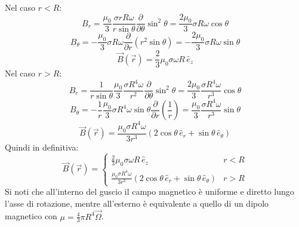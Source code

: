 \documentclass[]{article}
\begin{document}
Nel caso $ r < R $:
\begin{equation}
	B_r = \displaystyle\frac{\mu_0}{3} \displaystyle\frac{\sigma r R \omega}{r \sin\theta} \displaystyle\frac{\partial}{\partial\theta} \sin^2\theta = \displaystyle\frac{2\mu_0}{3} \sigma R \omega \cos\theta
	\label{eq:}
\end{equation}
\begin{equation}
	B_{\theta} = -\displaystyle\frac{\mu_0}{3} \sigma R \omega \displaystyle\frac{\partial}{\partial r} (r^2 \sin\theta) = -\displaystyle\frac{2\mu_0}{3} \sigma R \omega \sin\theta
	\label{eq:}
\end{equation}
\begin{equation}
	\vec{B}(\vec{r}) = \displaystyle\frac{2}{3} \mu_0 \sigma\omega R\,\hat{e}_z
	\label{eq:}
\end{equation}
Nel caso $ r > R $:
\begin{equation}
	B_r = \displaystyle\frac{1}{r \sin\theta} \displaystyle\frac{\mu_0}{3} \displaystyle\frac{\sigma R^4 \omega}{r^2} \displaystyle\frac{\partial}{\partial\theta} \sin^2\theta = \displaystyle\frac{2\mu_0}{3} \displaystyle\frac{\sigma R^4 \omega}{r^3} \cos\theta
	\label{eq:}
\end{equation}
\begin{equation}
	B_{\theta} = -\displaystyle\frac{1}{r} \displaystyle\frac{\mu_0}{3} \sigma R^4 \omega \sin\theta \displaystyle\frac{\partial}{\partial r} \left(\displaystyle\frac{1}{r}\right) = \displaystyle\frac{\mu_0}{3} \displaystyle\frac{\sigma R^4 \omega}{r^3} \sin\theta
	\label{eq:}
\end{equation}
\begin{equation}
	\vec{B}(\vec{r}) = \displaystyle\frac{\mu_0 \sigma R^4 \omega}{3 r^3} \left(2\cos\theta \,\hat{e}_r + \sin\theta \,\hat{e}_{\theta}\right)
	\label{eq:}
\end{equation}
Quindi in definitiva:
\begin{equation}
	\vec{B}(\vec{r}) =
	\begin{cases}
		\frac{2}{3} \mu_0 \sigma\omega R\,\hat{e}_z & r < R \\ 
		\displaystyle\frac{\mu_0 \sigma R^4 \omega}{3 r^3} \left(2\cos\theta \,\hat{e}_r + \sin\theta \,\hat{e}_{\theta}\right) & r > R
	\end{cases}
	\label{eq:mag-sf}
\end{equation}
Si noti che all'interno del guscio il campo magnetico è uniforme e diretto lungo l'asse di rotazione, mentre all'esterno è equivalente a quello di un dipolo magnetico con $ \mu = \frac{4}{3} \pi R^4 \vec{\Omega} $.
\end{document}
